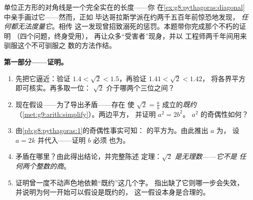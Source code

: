 \begin{problem}
\label{pb:g9:sqrt:1}
单位正方形的对角线是一个完全实在的长度——你
在\cref{ex:g8:pythagoras:diagonal}中亲手画过它——然而，正如
毕达哥拉斯学派在约两千五百年前惊恐地发现，
\emph{任何都无法度量它}。相传
这一发现曾招致溺死的惩罚。本题带你完成那个不朽的证明
（四个问题，终身受用），
再让众多“受害者”现身，并以
工程师两千年间用来驯服这个不可驯服之
数的方法作结。

\medskip
\noindent\textbf{第一部分——证明。}
\begin{enumerate}
  \item 先把它逼近：验证
        $1.4 < \sqrt2 < 1.5$，再验证 $1.41 < \sqrt2 < 1.42$，
        将各界平方即可核实。再多取一位：
        $\sqrt2$ 介于哪两个三位之间？
  \item 现在假设——为了导出矛盾——存在
        使 $\sqrt2 = \frac ab$ 成立的\emph{既约}
        （\cref{met:g9:arith:simplify}）。两边平方，
        并证明 $a^2 = 2 b^2$。
        $a^2$ 的奇偶性如何？
  \item 由\cref{pb:g8:pythagoras:1}的奇偶性事实可知：
        的平方为。由此推出 $a$ 为，
        设 $a = 2k$ 并代入——证明 $b$ 必须
        也为。
  \item 矛盾在哪里？由此得出结论，并完整陈述
        定理：\emph{$\sqrt2$ 是无理数——它不是
        任何两个整数的商}。
  \item 证明曾一度不动声色地依赖“既约”这几个字。
        指出缺了它则哪一步会失效，
        并说明为何一开始可以假设是既约的，
        这一假设本身是合理的。
\end{enumerate}


\end{problem}
